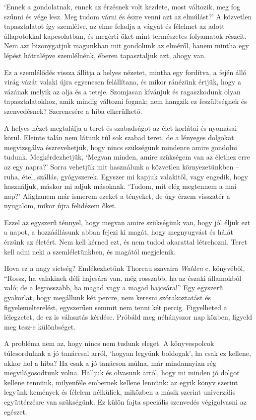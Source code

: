 `Ennek a gondolatnak, ennek az érzésnek volt kezdete, most változik, meg
fog szűnni és vége lesz. Meg tudom várni és észre venni azt az
elmúlást?' A közvetlen tapasztalatot így szemlélve, az elme feladja a
vágyat és félelmet az adott állapotokkal kapcsolatban, és megérti őket
mint természetes folyamatok részeit. Nem azt bizonygatjuk magunkban mit
gondolunk az elméről, hanem mintha egy lépést hátralépve szemlélnénk,
éberen tapasztaljuk azt, ahogy van.

Ez a szemlélődés vissza állítja a helyes nézetet, mintha egy fordítva, a
fején álló virág vázát valaki újra egyenesen felállítana, és mikor
ránézünk értjük, hogy a vázának melyik az alja és a teteje. Szomjasan
kívánjuk és ragaszkodunk olyan tapasztalatokhoz, amik mindig változni
fognak; nem hangzik ez feszültségnek és szenvedésnek? Szerencsére a hiba
elkerülhető.

A helyes nézet megtalálja a teret és szabadságot az élet korlátai és
nyomásai körül. Eleinte talán nem látunk túl sok szabad teret, de a
lényeges dolgokat megvizsgálva észrevehetjük, hogy nincs szükségünk
mindenre amire gondolni tudunk. Megkérdezhetjük, `Megvan minden, amire
szükségem van az élethez erre az egy napra?' Sorra vehetjük mit
használunk a közvetlen környezetünkben -- ruha, étel, szállás,
gyógyszerek. Egyszer mi kapjuk valakitől, vagy engedik, hogy használjuk,
máskor mi adjuk másoknak. `Tudom, mit elég megtennem a mai nap?'
Alighanem már ismerem ezeket a tényeket, de úgy érzem visszatér a
nyugalom, mikor újra felidézem őket.

Ezzel az egyszerű ténnyel, hogy megvan amire szükségünk van, hogy jól
éljük ezt a napot, a hozzáállásunk abban fejezi ki magát, hogy
megnyugvást és hálát érzünk az életért. Nem kell kérned ezt, és nem
tudod akarattal létrehozni. Teret kell adni neki a szemléletünkben, és
magától megjelenik.

Hova ez a nagy sietség? Emlékezhetünk Thoreau szavaira \emph{Walden} c.
könyvéből, ``Rossz, ha valakinek déli hajcsára van, még rosszabb, ha az
északi államokból való; de a legrosszabb, ha magad vagy a magad
hajcsára!'' Egy egyszerű gyakorlat, hogy megállunk két percre, nem
keresni szórakoztatást és figyelemelterelést, egyszerűen semmit nem
tenni két percig. Figyelheted a lélegzetet, de ez is választás kérdése.
Próbáld meg néhányszor nap közben, figyeld meg tesz-e különbséget.

A probléma nem az, hogy nincs nem tudunk eleget. A könyvespolcok
túlcsordulnak a jó tanáccsal arról, `hogyan legyünk boldogak', ha csak
ez kellene, akkor hol a hiba? Ha csak a jó tanácson múlna, már
mindannyian rég megvilágosodtunk volna. Halljuk és olvasunk arról, hogy
mi minden jó dolgot kellene tennünk, milyenféle embernek kellene
lennünk: az egyik könyv szerint legyünk kemények és félelem nélküliek,
miközben a másik szerint univerzális együttérzésre van szükségünk. Ez
külön fajta speciális szenvedés végigolvasni az egészet.

